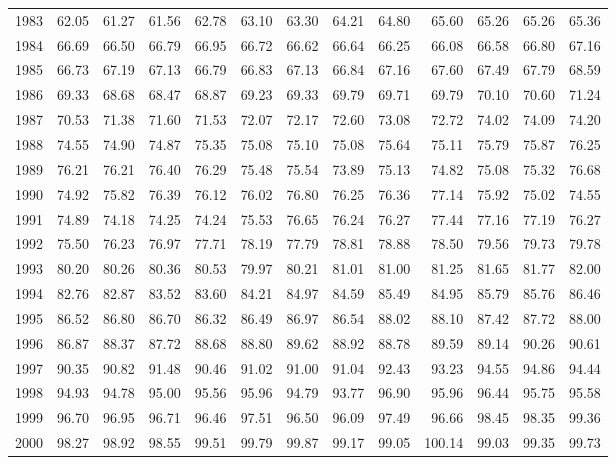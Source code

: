 \begin{longtable}{rrrrrrrrrrrrr}
  1983 & 62.05 & 61.27 & 61.56 & 62.78 & 63.10 & 63.30 & 64.21 & 64.80 & 65.60 & 65.26 & 65.26 & 65.36 \\ 
  1984 & 66.69 & 66.50 & 66.79 & 66.95 & 66.72 & 66.62 & 66.64 & 66.25 & 66.08 & 66.58 & 66.80 & 67.16 \\ 
  1985 & 66.73 & 67.19 & 67.13 & 66.79 & 66.83 & 67.13 & 66.84 & 67.16 & 67.60 & 67.49 & 67.79 & 68.59 \\ 
  1986 & 69.33 & 68.68 & 68.47 & 68.87 & 69.23 & 69.33 & 69.79 & 69.71 & 69.79 & 70.10 & 70.60 & 71.24 \\ 
  1987 & 70.53 & 71.38 & 71.60 & 71.53 & 72.07 & 72.17 & 72.60 & 73.08 & 72.72 & 74.02 & 74.09 & 74.20 \\ 
  1988 & 74.55 & 74.90 & 74.87 & 75.35 & 75.08 & 75.10 & 75.08 & 75.64 & 75.11 & 75.79 & 75.87 & 76.25 \\ 
  1989 & 76.21 & 76.21 & 76.40 & 76.29 & 75.48 & 75.54 & 73.89 & 75.13 & 74.82 & 75.08 & 75.32 & 76.68 \\ 
  1990 & 74.92 & 75.82 & 76.39 & 76.12 & 76.02 & 76.80 & 76.25 & 76.36 & 77.14 & 75.92 & 75.02 & 74.55 \\ 
  1991 & 74.89 & 74.18 & 74.25 & 74.24 & 75.53 & 76.65 & 76.24 & 76.27 & 77.44 & 77.16 & 77.19 & 76.27 \\ 
  1992 & 75.50 & 76.23 & 76.97 & 77.71 & 78.19 & 77.79 & 78.81 & 78.88 & 78.50 & 79.56 & 79.73 & 79.78 \\ 
  1993 & 80.20 & 80.26 & 80.36 & 80.53 & 79.97 & 80.21 & 81.01 & 81.00 & 81.25 & 81.65 & 81.77 & 82.00 \\ 
  1994 & 82.76 & 82.87 & 83.52 & 83.60 & 84.21 & 84.97 & 84.59 & 85.49 & 84.95 & 85.79 & 85.76 & 86.46 \\ 
  1995 & 86.52 & 86.80 & 86.70 & 86.32 & 86.49 & 86.97 & 86.54 & 88.02 & 88.10 & 87.42 & 87.72 & 88.00 \\ 
  1996 & 86.87 & 88.37 & 87.72 & 88.68 & 88.80 & 89.62 & 88.92 & 88.78 & 89.59 & 89.14 & 90.26 & 90.61 \\ 
  1997 & 90.35 & 90.82 & 91.48 & 90.46 & 91.02 & 91.00 & 91.04 & 92.43 & 93.23 & 94.55 & 94.86 & 94.44 \\ 
  1998 & 94.93 & 94.78 & 95.00 & 95.56 & 95.96 & 94.79 & 93.77 & 96.90 & 95.96 & 96.44 & 95.75 & 95.58 \\ 
  1999 & 96.70 & 96.95 & 96.71 & 96.46 & 97.51 & 96.50 & 96.09 & 97.49 & 96.66 & 98.45 & 98.35 & 99.36 \\ 
  2000 & 98.27 & 98.92 & 98.55 & 99.51 & 99.79 & 99.87 & 99.17 & 99.05 & 100.14 & 99.03 & 99.35 & 99.73 \\ 

\end{longtable}
